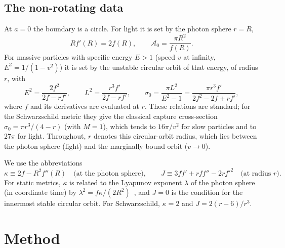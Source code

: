 \documentclass[11pt,a4paper]{article}
\theoremstyle{remark}
\numberwithin{equation}{section}
\begin{document}
\subsection{The non-rotating data}
At $a=0$ the boundary is a circle. For light it is set by the photon sphere $r=R$,
\begin{equation}
Rf'(R)=2f(R),\qquad \mathcal A_0=\frac{\pi R^2}{f(R)} .
\label{eq:photon}
\end{equation}
For massive particles with specific energy $E>1$ (speed $v$ at infinity, $E^2=1/(1-v^2)$) it is
set by the unstable circular orbit of that energy, of radius $r$, with
\begin{equation}
E^2=\frac{2f^2}{2f-rf'},\qquad L^2=\frac{r^3f'}{2f-rf'},\qquad
\sigma_0=\frac{\pi L^2}{E^2-1}=\frac{\pi r^3 f'}{2f^2-2f+rf'} ,
\label{eq:circ}
\end{equation}
where $f$ and its derivatives are evaluated at $r$. These relations are standard; for the
Schwarzschild metric they give the classical capture cross-section~\cite{Unruh1976} $\sigma_0=\pi r^3/(4-r)$ (with
$M=1$), which tends to $16\pi/v^2$ for slow particles and to $27\pi$ for light. Throughout, $r$
denotes this circular-orbit radius, which lies between the photon sphere (light) and the marginally
bound orbit ($v\to0$).

We use the abbreviations
\begin{equation}
\kappa\equiv2f-R^2f''(R)\quad\text{(at the photon sphere)},\qquad
J\equiv3ff'+rff''-2rf'^2\quad\text{(at radius $r$)} .
\label{eq:kappaJ}
\end{equation}
For static metrics, $\kappa$ is related to the Lyapunov exponent $\lambda$ of the photon sphere
(in coordinate time) by $\lambda^2=f\kappa/(2R^2)$~\cite{Cardoso2009}, and $J=0$ is the condition for
the innermost stable circular orbit. For Schwarzschild, $\kappa=2$ and $J=2(r-6)/r^3$.

\section{Method}\label{sec:method}
\end{document}
